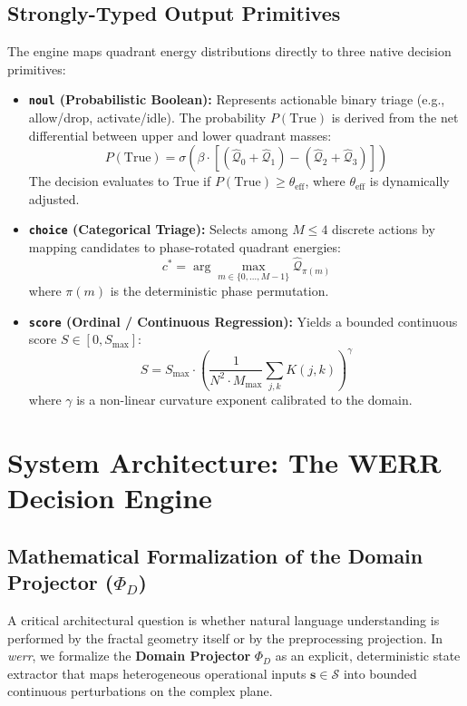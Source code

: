 \documentclass[10pt,journal,compsoc,twocolumn]{article}
\begin{document}
\subsection{Strongly-Typed Output Primitives}
The engine maps quadrant energy distributions directly to three native decision primitives:
\begin{itemize}
    \item \textbf{\texttt{noul} (Probabilistic Boolean):} Represents actionable binary triage (e.g., allow/drop, activate/idle). The probability $P(\text{True})$ is derived from the net differential between upper and lower quadrant masses:
    \begin{equation}
    P(\text{True}) = \sigma \left( \beta \cdot \left[ (\hat{\mathcal{Q}}_0 + \hat{\mathcal{Q}}_1) - (\hat{\mathcal{Q}}_2 + \hat{\mathcal{Q}}_3) \right] \right)
    \end{equation}
    The decision evaluates to True if $P(\text{True}) \ge \theta_{\text{eff}}$, where $\theta_{\text{eff}}$ is dynamically adjusted.
    \item \textbf{\texttt{choice} (Categorical Triage):} Selects among $M \le 4$ discrete actions by mapping candidates to phase-rotated quadrant energies:
    \begin{equation}
    c^* = \arg\max_{m \in \{0, \dots, M-1\}} \hat{\mathcal{Q}}_{\pi(m)}
    \end{equation}
    where $\pi(m)$ is the deterministic phase permutation.
    \item \textbf{\texttt{score} (Ordinal / Continuous Regression):} Yields a bounded continuous score $S \in [0, S_{\max}]$:
    \begin{equation}
    S = S_{\max} \cdot \left( \frac{1}{N^2 \cdot M_{\max}} \sum_{j,k} K(j,k) \right)^\gamma
    \end{equation}
    where $\gamma$ is a non-linear curvature exponent calibrated to the domain.
\end{itemize}

\section{System Architecture: The WERR Decision Engine}

\subsection{Mathematical Formalization of the Domain Projector ($\Phi_D$)}
A critical architectural question is whether natural language understanding is performed by the fractal geometry itself or by the preprocessing projection. In \textit{werr}, we formalize the \textbf{Domain Projector} $\Phi_D$ as an explicit, deterministic state extractor that maps heterogeneous operational inputs $\mathbf{s} \in \mathcal{S}$ into bounded continuous perturbations on the complex plane.
\end{document}
